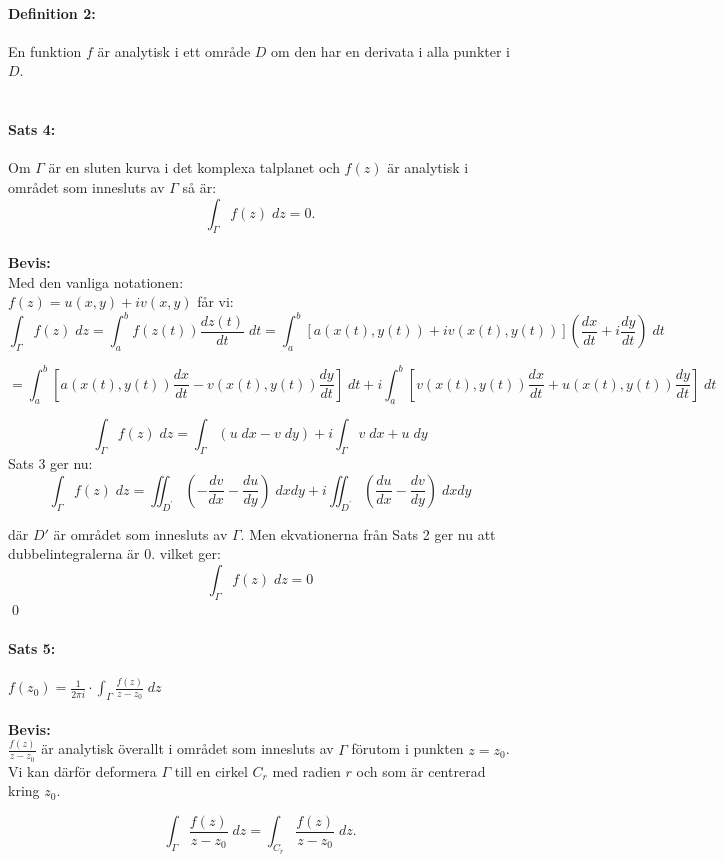 \paragraph{Definition 2:} En funktion $f$ är analytisk i ett område $D$ om den har en derivata i alla punkter i $D$.\\
\\
\paragraph{Sats 4:} Om $\Gamma$ är en sluten kurva i det komplexa talplanet och $f(z)$ är analytisk i området som innesluts av $\Gamma$ så är:
$$\int_{\Gamma} f(z) \; dz = 0.$$
\\
{\bf Bevis:}\\
Med den vanliga notationen:\\
$f(z) = u(x, y) + iv(x, y)$ får vi:
$$\int_{\Gamma} f(z) \; dz = \int_a^b f(z(t)) \frac {dz(t)} {dt} \; dt = \int_a^b [a(x(t), y(t)) + iv(x(t), y(t)) ]
\left ( \frac {dx} {dt} + i \frac {dy} {dt} \right ) \; dt$$

$$= \int_a^b \left [a(x(t), y(t)) \frac {dx} {dt} - v(x(t), y(t)) \frac {dy} {dt} \right ] \; dt + i \int_a^b \left [v(x(t), y(t)) \frac {dx} {dt} + 
u(x(t), y (t)) \frac {dy} {dt} \right ] \; dt$$

$$\int_{\Gamma} f(z) \; dz = \int_\Gamma (u \; dx - v \; dy) + i \int_\Gamma v \; dx + u \; dy$$
Sats 3 ger nu:
$$\int_{\Gamma} f(z) \; dz = \iint_{D^\prime} \left ( - \frac {dv} {dx} - \frac {du} {dy} \right ) \; dxdy +
i \iint_{D^\prime} \left ( \frac {du} {dx} - \frac {dv} {dy} \right ) \; dxdy$$

där $D'$ är området som innesluts av $\Gamma$. Men ekvationerna från Sats 2 ger nu att
dubbelintegralerna är $0$. vilket ger:
$$\int_\Gamma f(z) \; dz = 0$$
\hfill \qed

\paragraph{Sats 5:} $f(z_0) = \frac 1 {2\pi i} \cdot \int_\Gamma \frac {f(z)} {z - z_0} \; dz$ \\
\\
{\bf Bevis:}\\
$\frac {f(z)} {z - z_0}$ är analytisk överallt i området som innesluts av $\Gamma$ förutom i punkten
$z = z_0$. Vi kan därför deformera $\Gamma$ till en cirkel $C_r$ med radien $r$ och 
som är centrerad kring $z_0$.

\[ \int_\Gamma \frac {f(z)} {z - z_0} \; dz = \int_{C_r} \frac {f(z)} {z - z_0} \; dz. \]

